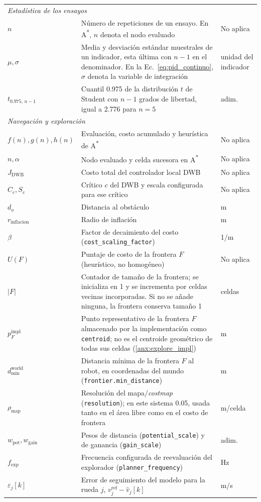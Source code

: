 \begin{appendices}
{\begin{longtable}{p{2.7cm} p{8.5cm} p{2.2cm}}
\multicolumn{3}{l}{\textit{Estadística de los ensayos}}\\
$n$ & Número de repeticiones de un ensayo. En A\textsuperscript{*}, $n$ denota el nodo evaluado & No aplica \\
$\mu,\sigma$ & Media y desviación estándar muestrales de un indicador, esta última con $n-1$ en el denominador. En la Ec.~\eqref{eq:pid_continuo}, $\sigma$ denota la variable de integración & unidad del indicador \\
$t_{0.975,\,n-1}$ & Cuantil 0.975 de la distribución $t$ de Student con $n-1$ grados de libertad, igual a 2.776 para $n=5$ & adim. \\
\multicolumn{3}{l}{\textit{Navegación y exploración}}\\
$f(n),g(n),h(n)$ & Evaluación, costo acumulado y heurística de A\textsuperscript{*} & No aplica \\
$n,\alpha$ & Nodo evaluado y celda sucesora en A\textsuperscript{*} & No aplica \\
$J_{\mathrm{DWB}}$ & Costo total del controlador local DWB & No aplica \\
$C_c,S_c$ & Crítico $c$ del DWB y escala configurada para ese crítico & No aplica \\
$d_o$ & Distancia al obstáculo & m \\
$r_{\mathrm{inflacion}}$ & Radio de inflación & m \\
$\beta$ & Factor de decaimiento del costo (\texttt{cost\_scaling\_factor}) & 1/m \\
$U(F)$ & Puntaje de costo de la frontera $F$ (heurístico, no homogéneo) & No aplica \\
$|F|$ & Contador de tamaño de la frontera; se inicializa en 1 y se incrementa por celdas vecinas incorporadas. Si no se añade ninguna, la frontera conserva tamaño 1 & celdas \\
$p_F^{\mathrm{impl}}$ & Punto representativo de la frontera $F$ almacenado por la implementación como \texttt{centroid}; no es el centroide geométrico de todas sus celdas (\ref{anx:explore_impl}) & m \\
$d_{\mathrm{min}}^{\mathrm{world}}$ & Distancia mínima de la frontera $F$ al robot, en coordenadas del mundo (\texttt{frontier.min\_distance}) & m \\
$\rho_{\mathrm{map}}$ & Resolución del mapa/\textit{costmap} (\texttt{resolution}); en este sistema 0.05, usada tanto en el área libre como en el costo de frontera & m/celda \\
$w_{\mathrm{pot}},w_{\mathrm{gain}}$ & Pesos de distancia (\texttt{potential\_scale}) y de ganancia (\texttt{gain\_scale}) & adim. \\
$f_{\mathrm{exp}}$ & Frecuencia configurada de reevaluación del explorador (\texttt{planner\_frequency}) & Hz \\
$\varepsilon_j[k]$ & Error de seguimiento del modelo para la rueda $j$,
$v_j^{\mathrm{ref}}-\hat{v}_j[k]$ & m/s \\
\end{longtable}
}

\end{appendices}
